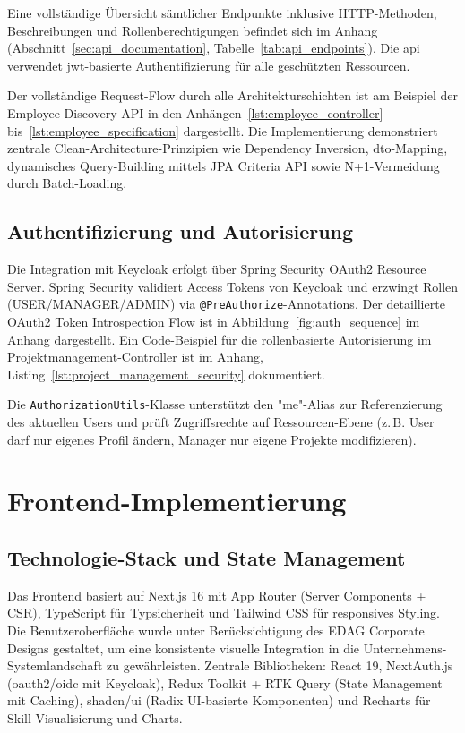 Eine vollständige Übersicht sämtlicher Endpunkte inklusive HTTP-Methoden, Beschreibungen und Rollenberechtigungen befindet sich im Anhang (Abschnitt~\ref{sec:api_documentation}, Tabelle~\ref{tab:api_endpoints}). Die \gls{api} verwendet \gls{jwt}-basierte Authentifizierung\cite{jwt_rfc} für alle geschützten Ressourcen.

Der vollständige Request-Flow durch alle Architekturschichten ist am Beispiel der Employee-Discovery-API in den Anhängen~\ref{lst:employee_controller} bis~\ref{lst:employee_specification} dargestellt. Die Implementierung demonstriert zentrale Clean-Architecture-Prinzipien wie Dependency Inversion, \gls{dto}-Mapping, dynamisches Query-Building mittels JPA Criteria API sowie N+1-Vermeidung durch Batch-Loading.

\subsection{Authentifizierung und Autorisierung}

Die Integration mit Keycloak\cite{keycloak_docs} erfolgt über Spring Security OAuth2 Resource Server\cite{spring_security_oauth2}. Spring Security validiert Access Tokens von Keycloak und erzwingt Rollen (USER/MANAGER/ADMIN) via \texttt{@PreAuthorize}-Annotations. Der detaillierte OAuth2 Token Introspection Flow ist in Abbildung~\ref{fig:auth_sequence} im Anhang dargestellt. Ein Code-Beispiel für die rollenbasierte Autorisierung im Projektmanagement-Controller ist im Anhang, Listing~\ref{lst:project_management_security} dokumentiert.

Die \texttt{AuthorizationUtils}-Klasse unterstützt den "me"-Alias zur Referenzierung des aktuellen Users und prüft Zugriffsrechte auf Ressourcen-Ebene (z.\,B. User darf nur eigenes Profil ändern, Manager nur eigene Projekte modifizieren).

\section{Frontend-Implementierung}

\subsection{Technologie-Stack und State Management}

Das Frontend basiert auf Next.js 16 mit App Router (Server Components + CSR), Type\-Script für Typsicherheit und Tailwind CSS für responsives Styling\cite{nextjs_docs,typescript_docs,tailwind_docs}. Die Benutzeroberfläche wurde unter Berücksichtigung des EDAG Corporate Designs gestaltet, um eine konsistente visuelle Integration in die Unternehmens-Systemlandschaft zu gewährleisten. Zentrale Bibliotheken: React 19\cite{react_docs}, NextAuth.js\cite{nextauth_docs} (\gls{oauth}2/\gls{oidc} mit Keycloak), Redux Toolkit + RTK Query\cite{redux_toolkit} (State Management mit Caching), shadcn/ui\cite{shadcn_ui} (Radix UI-basierte Komponenten) und Recharts\cite{recharts_docs} für Skill-Visualisierung und Charts.

